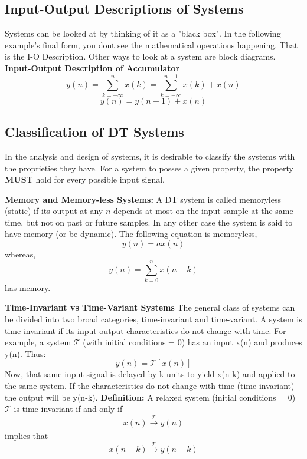 \documentclass{article} %
\begin{document}
	\subsection{Input-Output Descriptions of Systems}
	Systems can be looked at by thinking of it as a "black box". In the following example's final form, you dont see the mathematical operations happening. That is the I-O Description. Other ways to look at a system are block diagrams.
	\textbf{Input-Output Description of Accumulator}
	\begin{equation}
 	y(n) = \sum_{k = -\infty}^n x(k) = \sum_{k = -\infty}^{n-1} x(k) + x(n)
	\end{equation}
	\begin{equation}
 	y(n) = y(n-1) + x(n)
	\end{equation}
	
	\subsection{Classification of DT Systems}
	
	In the analysis and design of systems, it is desirable to classify the systems with the proprieties they have. For a system to posses a given property, the property \textbf{MUST} hold for every possible input signal. 
	
	\textbf{Memory and Memory-less Systems:} A DT system is called memoryless (static) if its output at any $n$ depends at most on the input sample at the same time, but not on past or future samples. In any other case the system is said to have memory (or be dynamic). The following equation is memoryless, 
	\begin{equation}
 	y(n) = ax(n)
	\end{equation}
	whereas,
	\begin{equation}
 	y(n) = \sum_{k=0}^n x(n-k)
	\end{equation}
	has memory. 
	
	\textbf{Time-Invariant vs Time-Variant Systems}
	The general class of systems can be divided into two broad categories, time-invariant and time-variant. A system is time-invariant if its input output characteristics do not change with time. For example, a system $\mathcal{T}$ (with initial conditions = 0) has an input x(n) and produces y(n). Thus:
	\begin{equation}
 	 y(n) = \mathcal{T}[x(n)]
	\end{equation}
	Now, that same input signal is delayed by k units to yield x(n-k) and applied to the same system. If the characteristics do not change with time (time-invariant) the output will be y(n-k). 
	\textbf{Definition:} A relaxed system (initial conditions = 0) $\mathcal{T}$ is time invariant if and only if 
	\begin{equation}
 	x(n) \xrightarrow[]{\mathcal{T}}  y(n)
	\end{equation}
	implies that 
	\begin{equation}
 	x(n-k) \xrightarrow[]{\mathcal{T}}  y(n-k)
	\end{equation}
	
\end{document}
